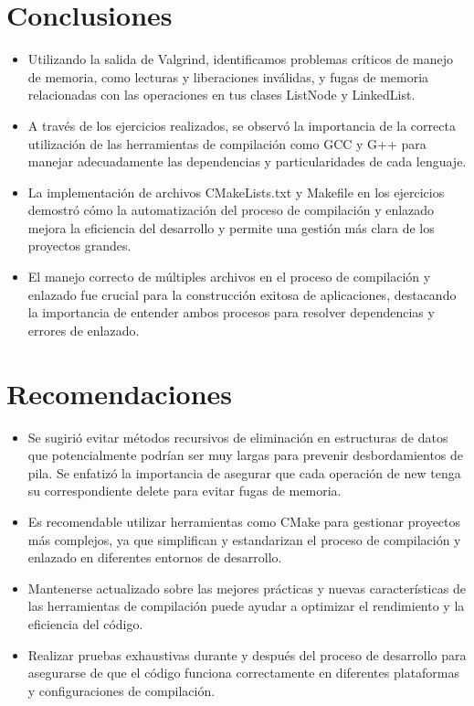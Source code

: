 \documentclass[]{article}
\begin{document}
        \section{Conclusiones}
        \begin{itemize}
            \item Utilizando la salida de Valgrind, identificamos problemas críticos de manejo de memoria, como lecturas y liberaciones inválidas, y fugas de memoria relacionadas con las operaciones en tus clases ListNode y LinkedList.
            \item A través de los ejercicios realizados, se observó la importancia de la correcta utilización de las herramientas de compilación como GCC y G++ para manejar adecuadamente las dependencias y particularidades de cada lenguaje.
            \item La implementación de archivos CMakeLists.txt y Makefile en los ejercicios demostró cómo la automatización del proceso de compilación y enlazado mejora la eficiencia del desarrollo y permite una gestión más clara de los proyectos grandes.
            \item El manejo correcto de múltiples archivos en el proceso de compilación y enlazado fue crucial para la construcción exitosa de aplicaciones, destacando la importancia de entender ambos procesos para resolver dependencias y errores de enlazado.
        \end{itemize}
        \section{Recomendaciones}
        \begin{itemize}
            \item Se sugirió evitar métodos recursivos de eliminación en estructuras de datos que potencialmente podrían ser muy largas para prevenir desbordamientos de pila.
Se enfatizó la importancia de asegurar que cada operación de new tenga su correspondiente delete para evitar fugas de memoria.
            \item  Es recomendable utilizar herramientas como CMake para gestionar proyectos más complejos, ya que simplifican y estandarizan el proceso de compilación y enlazado en diferentes entornos de desarrollo.
            \item Mantenerse actualizado sobre las mejores prácticas y nuevas características de las herramientas de compilación puede ayudar a optimizar el rendimiento y la eficiencia del código.
            \item Realizar pruebas exhaustivas durante y después del proceso de desarrollo para asegurarse de que el código funciona correctamente en diferentes plataformas y configuraciones de compilación.
        \end{itemize}
\renewcommand{\listlistingname}{Indice Source Code}
\listoflistings
\end{document}
